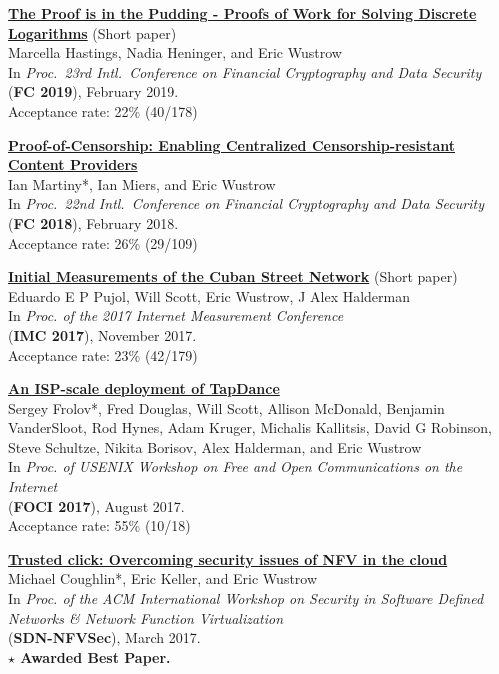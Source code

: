 \documentclass[margin,11pt]{res} %
\begin{document}
    \textbf{\href{https://eprint.iacr.org/2018/939.pdf}{The Proof is in the Pudding - Proofs of Work for Solving Discrete Logarithms}} (Short paper) \\
    Marcella Hastings, Nadia Heninger, and Eric Wustrow \\
    In \emph{Proc.\ 23rd Intl.\ Conference on Financial Cryptography and Data Security} \\
    (\textbf{FC 2019}), February 2019.\\
    Acceptance rate: 22\% (40/178)   %

    \textbf{\href{https://ericw.us/trow/proof-of-censorship.pdf}{Proof-of-Censorship: Enabling Centralized Censorship-resistant Content Providers}} \\
    Ian Martiny*, Ian Miers, and Eric Wustrow \\
    In \emph{Proc.\ 22nd Intl.\ Conference on Financial Cryptography and Data Security} \\
    (\textbf{FC 2018}), February 2018. \\
    Acceptance rate: 26\% (29/109)

    \textbf{\href{https://conferences.sigcomm.org/imc/2017/papers/imc17-final186.pdf}{Initial Measurements of the Cuban Street Network}} (Short paper) \\
    Eduardo E P Pujol, Will Scott, Eric Wustrow, J Alex Halderman \\
    In \emph{Proc. of the 2017 Internet Measurement Conference} \\
    (\textbf{IMC 2017}), November 2017. \\
    Acceptance rate: 23\% (42/179)

    \textbf{\href{https://www.usenix.org/system/files/conference/foci17/foci17-paper-frolov_0.pdf}{An ISP-scale deployment of TapDance}} \\
    Sergey Frolov*, Fred Douglas, Will Scott, Allison McDonald, Benjamin VanderSloot, Rod Hynes, Adam Kruger, Michalis Kallitsis, David G Robinson, Steve Schultze, Nikita Borisov, Alex Halderman, and Eric Wustrow \\
    In \emph{Proc. of USENIX Workshop on Free and Open Communications on the Internet} \\
    (\textbf{FOCI 2017}), August 2017. \\
    Acceptance rate: 55\% (10/18)

    \textbf{\href{http://nsr.colorado.edu/coughlin/doc/sdnnfvsec2017.pdf}{Trusted click: Overcoming security issues of NFV in the cloud}} \\
    Michael Coughlin*, Eric Keller, and Eric Wustrow \\
    In \emph{Proc. of the ACM International Workshop on Security in Software Defined Networks \& Network Function Virtualization} \\
    (\textbf{SDN-NFVSec}), March 2017. \\
    \textbf{$\star$ Awarded Best Paper.}
\end{document}
